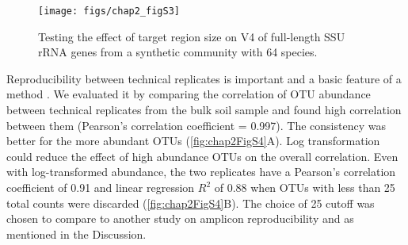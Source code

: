 \documentclass[]{msu-thesis}
\begin{document}
\begin{figure}[tbph!]
  \centering
  \texttt{[image: figs/chap2\_figS3]}
  \caption[Testing the effect of target region size on V4 of full-length SSU rRNA genes from a synthetic community]{Testing the effect of target region size on V4 of full-length SSU rRNA genes from a synthetic community with 64 species.}
  \label{fig:chap2FigS3}
\end{figure}


Reproducibility between technical replicates is important and a basic feature of a method \cite{zhou_reproducibility_2011,zhou_high-throughput_2015}. We evaluated it by comparing the correlation of OTU abundance between technical replicates from the bulk soil sample and found high correlation between them (Pearson’s correlation coefficient = 0.997). The consistency was better for the more abundant OTUs (\cref{fig:chap2FigS4}A). Log transformation could reduce the effect of high abundance OTUs on the overall correlation. Even with log-transformed abundance, the two replicates have a Pearson’s correlation coefficient of 0.91 and linear regression $R^2$ of 0.88 when OTUs with less than 25 total counts were discarded (\cref{fig:chap2FigS4}B). The choice of 25 cutoff was chosen to compare to another study on amplicon reproducibility \cite{lundberg_defining_2012} and as mentioned in the Discussion. 
\end{document}
